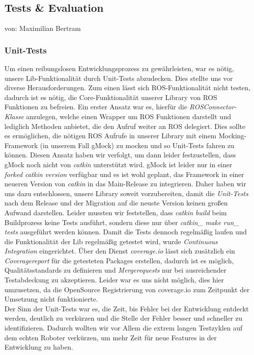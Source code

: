 \documentclass{suturo}
\makeatletter
\newcommand{\chapterauthor}[1]{%
  {\parindent0pt\vspace*{-27pt}%
  \linespread{0}\small\begin{flushright}von: #1\end{flushright}%
  \par\nobreak\vspace*{0pt}}
  \@afterheading%
}
\makeatother
\begin{document}
\begin{figure}[!htb]
\end{figure}

\newpage

\subsection{Tests \& Evaluation}
\chapterauthor{Maximilian Bertram}

\subsubsection{Unit-Tests}
Um einen reibungslosen Entwicklungsprozess zu gewährleisten, war es nötig, unsere Lib-Funktionalität durch Unit-Tests abzudecken. Dies stellte uns vor diverse Herausforderungen. Zum einen lässt sich ROS-Funktionalität nicht testen, dadurch ist es nötig, die Core-Funktionalität unserer Library von ROS Funktionen zu befreien. Ein erster Ansatz war es, hierfür die \textit{ROSConnector-Klasse} anzulegen, welche einen Wrapper um ROS Funktionen darstellt und lediglich Methoden anbietet, die den Aufruf weiter an ROS delegiert. Dies sollte es ermöglichen, die nötigen ROS Aufrufe in unserer Library mit einem Mocking-Framework (in unserem Fall gMock) zu mocken und so Unit-Tests fahren zu können. Diesen Ansatz haben wir verfolgt, um dann leider festzustellen, dass gMock noch nicht von \textit{catkin} unterstützt wird. gMock ist leider nur in einer \textit{forked catkin version} verfügbar und es ist wohl geplant, das Framework in einer neueren Version von \textit{catkin} in das Main-Release zu integrieren. Daher haben wir uns dazu entschlossen, unsere Library soweit vorzubereiten, damit die \textit{Unit-Tests} nach dem Release und der Migration auf die neuste Version keinen großen Aufwand darstellen. Leider mussten wir feststellen, dass \textit{catkin build} beim Buildprozess keine Tests ausführt, sondern diese nur über \textit{catkin\_ make run\_ tests} ausgeführt werden können. Damit die Tests dennoch regelmäßig laufen und die Funktionalität der Lib regelmäßig getestet wird, wurde \textit{Continuous Integration} eingerichtet. Über den Dienst \textit{coverage.io} lässt sich zusätzlich ein \textit{Coveragereport} für die getesteten Packages erstellen, dadurch ist es möglich, Qualitätsstandards zu definieren und \textit{Mergerequests} nur bei ausreichender Testabdeckung zu akzeptieren. Leider war es uns nicht möglich, dies hier umzusetzen, da die OpenSource Registrierung von coverage.io zum Zeitpunkt der Umsetzung nicht funktionierte. \\
Der Sinn der Unit-Tests war es, die Zeit, bis Fehler bei der Entwicklung entdeckt werden, deutlich zu verkürzen und die Stelle der Fehler besser und schneller zu identifizieren. Dadurch wollten wir vor Allem die extrem langen Testzyklen auf dem echten Roboter verkürzen, um mehr Zeit für neue Features in der Entwicklung zu haben. \\
\end{document}
